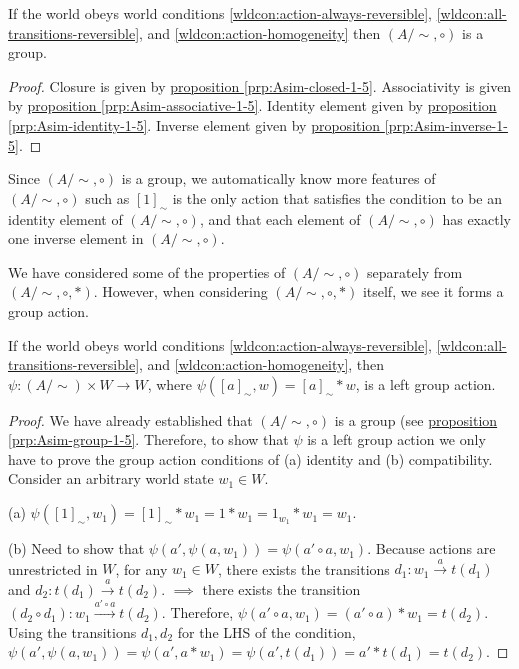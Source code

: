 \begin{proposition}\label{prp:Asim-group-1-5}
    If the world obeys world conditions \ref{wldcon:action-always-reversible}, \ref{wldcon:all-transitions-reversible}, and \ref{wldcon:action-homogeneity} then $(A/\sim, \circ)$ is a group.
\end{proposition}
\begin{proof}
    Closure is given by \hyperref[prp:Asim-closed-1-5]{proposition \ref*{prp:Asim-closed-1-5}}.
    Associativity is given by \hyperref[prp:Asim-associative-1-5]{proposition \ref*{prp:Asim-associative-1-5}}.
    Identity element given by \hyperref[prp:Asim-identity-1-5]{proposition \ref*{prp:Asim-identity-1-5}}.
    Inverse element given by \hyperref[prp:Asim-inverse-1-5]{proposition \ref*{prp:Asim-inverse-1-5}}.
\end{proof}

\begin{remark}
    Since $(A/\sim, \circ)$ is a group, we automatically know more features of $(A/\sim, \circ)$ such as $[1]_{\sim}$ is the only action that satisfies the condition to be an identity element of $(A/\sim, \circ)$, and that each element of $(A/\sim, \circ)$ has exactly one inverse element in $(A/\sim, \circ)$.
\end{remark}

We have considered some of the properties of $(A/\sim, \circ)$ separately from $(A/\sim, \circ, *)$.
However, when considering $(A/\sim, \circ, *)$ itself, we see it forms a group action.

\begin{proposition}\label{prp:action-homogeneity-sufficient}
    If the world obeys world conditions \ref{wldcon:action-always-reversible}, \ref{wldcon:all-transitions-reversible}, and \ref{wldcon:action-homogeneity}, then $\psi: (A/\sim) \times W \to W$, where $\psi([a]_{\sim}, w) = [a]_{\sim} * w$, is a left group action.
\end{proposition}
\begin{proof}
    We have already established that $(A/\sim, \circ)$ is a group (see \hyperref[prp:Asim-group-1-5]{proposition \ref*{prp:Asim-group-1-5}}.
    Therefore, to show that $\psi$ is a left group action we only have to prove the group action conditions of (a) identity and (b) compatibility.
    Consider an arbitrary world state $w_{1} \in W$.
    
    (a) $\psi([1]_{\sim}, w_{1}) = [1]_{\sim} * w_{1} = 1 * w_{1} = 1_{w_{1}} * w_{1} = w_{1}$.
    
    (b) Need to show that $\psi(a', \psi(a, w_{1})) = \psi(a' \circ a, w_{1})$.
    Because actions are unrestricted in $W$, for any $w_{1} \in W$, there exists the transitions $d_{1}: w_{1} \xrightarrow{a} t(d_{1})$ and $d_{2}: t(d_{1}) \xrightarrow{a} t(d_{2})$.
    $\implies$ there exists the transition $(d_{2} \circ d_{1}): w_{1} \xrightarrow{a' \circ a} t(d_{2})$.
    Therefore, $\psi(a' \circ a, w_{1}) = (a' \circ a) * w_{1} = t(d_{2})$.
    Using the transitions $d_{1}, d_{2}$ for the LHS of the condition, $\psi(a', \psi(a, w_{1})) = \psi(a', a * w_{1}) = \psi(a', t(d_{1})) = a' * t(d_{1}) = t(d_{2})$.
\end{proof}

